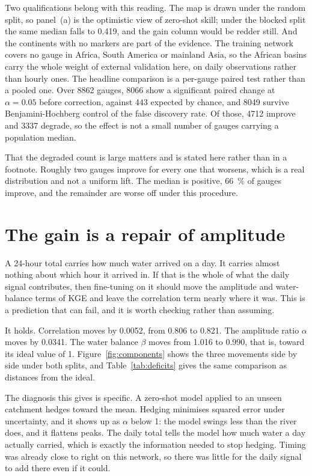 \documentclass[11pt,a4paper]{article}
\begin{document}
Two qualifications belong with this reading. The map is drawn under the random split, so panel~(a) is the optimistic view of zero-shot skill; under the blocked split the same median falls to \num{0.419}, and the gain column would be redder still. And the continents with no markers are part of the evidence. The training network covers no gauge in Africa, South America or mainland Asia, so the African basins carry the whole weight of external validation here, on daily observations rather than hourly ones.
The headline comparison is a per-gauge paired test rather than a pooled one. Over \num{8862} gauges, \num{8066} show a significant paired change at $\alpha = \num{0.05}$ before correction, against \num{443} expected by chance, and \num{8049} survive Benjamini-Hochberg control of the false discovery rate. Of those, \num{4712} improve and \num{3337} degrade, so the effect is not a small number of gauges carrying a population median.

That the degraded count is large matters and is stated here rather than in a footnote. Roughly two gauges improve for every one that worsens, which is a real distribution and not a uniform lift. The median is positive, \SI{66}{\percent} of gauges improve, and the remainder are worse off under this procedure.

\section{The gain is a repair of amplitude}\label{sec:mechanism}
A 24-hour total carries how much water arrived on a day. It carries almost nothing about which hour it arrived in. If that is the whole of what the daily signal contributes, then fine-tuning on it should move the amplitude and water-balance terms of KGE and leave the correlation term nearly where it was. This is a prediction that can fail, and it is worth checking rather than assuming.

It holds. Correlation moves by \num{+0.0052}, from \num{0.806} to \num{0.821}. The amplitude ratio $\alpha$ moves by \num{+0.0341}. The water balance $\beta$ moves from \num{1.016} to \num{0.990}, that is, toward its ideal value of 1. Figure~\ref{fig:components} shows the three movements side by side under both splits, and Table~\ref{tab:deficits} gives the same comparison as distances from the ideal.

The diagnosis this gives is specific. A zero-shot model applied to an unseen catchment hedges toward the mean. Hedging minimises squared error under uncertainty, and it shows up as $\alpha$ below 1: the model swings less than the river does, and it flattens peaks. The daily total tells the model how much water a day actually carried, which is exactly the information needed to stop hedging. Timing was already close to right on this network, so there was little for the daily signal to add there even if it could.
\end{document}
